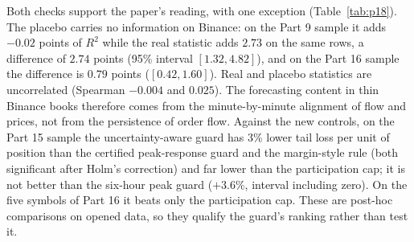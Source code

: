 \documentclass[12pt]{article}
\theoremstyle{definition}
\theoremstyle{remark}
\begin{document}
Both checks support the paper's reading, with one exception (Table~\ref{tab:p18}). The placebo carries no information on Binance: on the Part 9 sample it adds $-0.02$ points of $R^2$ while the real statistic adds $2.73$ on the same rows, a difference of $2.74$ points (95\% interval $[1.32,4.82]$), and on the Part 16 sample the difference is $0.79$ points ($[0.42,1.60]$). Real and placebo statistics are uncorrelated (Spearman $-0.004$ and $0.025$). The forecasting content in thin Binance books therefore comes from the minute-by-minute alignment of flow and prices, not from the persistence of order flow. Against the new controls, on the Part 15 sample the uncertainty-aware guard has 3\% lower tail loss per unit of position than the certified peak-response guard and the margin-style rule (both significant after Holm's correction) and far lower than the participation cap; it is not better than the six-hour peak guard ($+3.6\%$, interval including zero). On the five symbols of Part 16 it beats only the participation cap. These are post-hoc comparisons on opened data, so they qualify the guard's ranking rather than test it.
\end{document}
